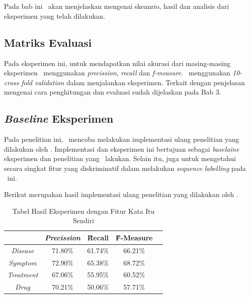 \chapter{\babLima}

Pada bab ini \saya~akan menjelaskan mengenai skeanrio, hasil dan analisis dari eksperimen yang telah dilakukan.

\section{Matriks Evaluasi}
Pada eksperimen ini, untuk mendapatkan nilai akurasi dari masing-masing eksperimen \saya~menggunakan \textit{precission}, \textit{recall} dan \textit{f-measure}. \Saya~menggunakan \textit{10-cross fold validation} dalam menjalankan eksperimen. Terkait dengan penjelasan mengenai cara penghitungan dan evaluasi sudah dijelaskan pada Bab 3.

\section{\textit{Baseline} Eksperimen}
Pada penelitian ini, \saya~mencoba melakukan implementasi ulang penelitian yang dilakukan oleh \cite{skripsiKakRadit}. Implementasi dan eksperimen ini bertujuan sebagai \textit{baselaine} eksperimen dan penelitian yang \saya~lakukan. Selain itu, juga untuk mengetahui secara singkat fitur yang diskriminatif dalam melakukan \textit{sequence labelling} pada \mer~ini.

Berikut merupakan hasil implementasi ulang penelitian yang dilakukan oleh \cite{skripsiKakRadit}.
	
\begin{table}
	\centering
	\caption{Tabel Hasil Eksperimen dengan Fitur Kata Itu Sendiri}
	\begin{tabular}{|c|c|c|c|c|}
		\hline
							& \textit{Precission} & \f{\f{Recall}} & \f{\f{F-Measure}} \\ \hline
		\textit{Disease}    & 71.80\%             & 61.74\%        & 66.21\%           \\ \hline
		\textit{Symptom}    & 72.90\%             & 65.38\%        & 68.72\%           \\ \hline
		\textit{Treatment}  & 67.06\%             & 55.95\%        & 60.52\%           \\ \hline
		\textit{Drug}		& 70.21\%             & 50.06\%        & 57.71\%           \\ \hline
	    \end{tabular}
\label{table:radit}
\end{table}

